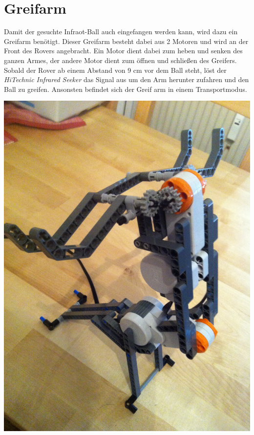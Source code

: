 \section{Greifarm}

Damit der gesuchte Infraot-Ball auch eingefangen werden kann, wird dazu ein Greifarm benötigt. Dieser Greifarm besteht dabei aus 2 Motoren und wird an der Front des Rovers angebracht. Ein Motor dient dabei zum heben und senken des ganzen Armes, der andere Motor dient zum öffnen und schließen des Greifers. Sobald der Rover ab einem Abstand von 9 cm vor dem Ball steht, löst der \textit{HiTechnic Infrared Seeker} das Signal aus um den Arm herunter zufahren und den Ball zu greifen. Ansonsten befindet sich der Greif arm in einem Transportmodus.

\begin{capfigure}
	\includegraphics[width=\textwidth]{images/construction/greifarm/Greifarm1}
\end{capfigure}


